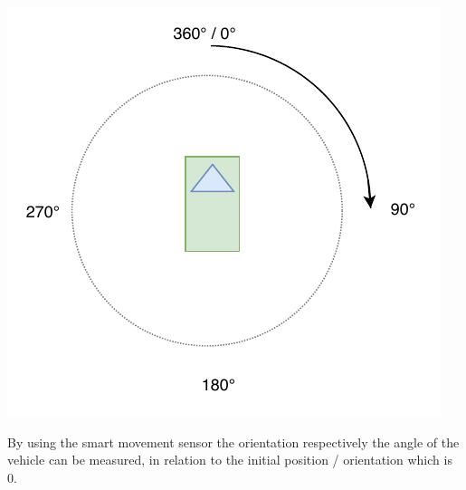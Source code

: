 \begin{minipage}{0.5\textwidth}
\centering
	\includegraphics[scale=0.6]{sources/mapping/orientation.pdf}
\end{minipage}
\begin{minipage}{0.5\textwidth}

By using the smart movement sensor the orientation respectively the angle of the vehicle can be measured, in relation to the initial position / orientation which is 0\degree.

\end{minipage}

